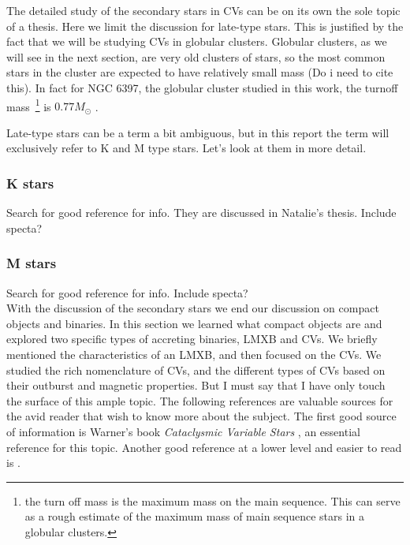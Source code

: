 The detailed study of the secondary stars in CVs can be on its own the sole topic of a thesis. Here we limit the discussion for late-type stars.  This is justified by the fact that we will be studying CVs in globular clusters. Globular clusters, as we will see in the next section, are very old clusters of stars, so the most common stars in the cluster are expected to have relatively small mass (Do i need to cite this). In fact for NGC 6397, the globular cluster studied in this work, the turnoff mass~\footnote{the turn off mass is the maximum mass on the main sequence. This can serve as a rough estimate of the maximum mass of main sequence stars in a globular clusters.} is $0.77 M_\odot$ \citep{de_marco_spectroscopic_2005}. 

Late-type stars can be a term a bit ambiguous, but in this report the term will exclusively refer to K and M type stars. Let's look at them in more detail.  

\subsubsection{K stars}

Search for good reference for info. They are discussed in Natalie's thesis. Include specta?


\subsubsection{M stars}

Search for good reference for info. Include specta? \\



With the discussion of the secondary stars we end our discussion on compact objects and binaries. In this section we learned what compact objects are and explored two specific types of accreting binaries, LMXB and CVs. We briefly mentioned the characteristics of an LMXB, and then focused on the CVs. We studied the rich nomenclature of CVs, and the different types of CVs based on their outburst and magnetic properties. But I must say that I have only touch the surface of this ample topic. The following references are valuable sources for the avid reader that wish to know more about the subject. The first good source of information is Warner's book \emph{Cataclysmic Variable Stars} \citep{warner_cataclysmic_2003}, an essential reference for this topic. Another good reference at a lower level and easier to read is \cite{hellier_cataclysmic_2001}. 

